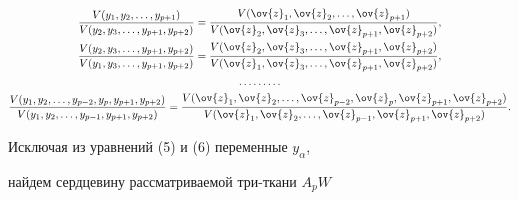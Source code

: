 \begin{gather}


\frac{V(y_{1}, y_{2}, \dotsc, y_{p+1})}{V(y_{2}, y_{3},


\dotsc, y_{p+1}, y_{p+2})}


=\frac{V(\ov{z}_{1}, \ov{z}_{2}, \dotsc, \ov{z}_{p+1})}


{V(\ov{z}_{2}, \ov{z}_{3}, \dotsc, \ov{z}_{p+1}, \ov{z}_{p+2})},\notag\\


%


\frac{V(y_{2}, y_{3}, \dotsc, y_{p+1}, y_{p+2})}{V(y_{1}, y_{3},


\dotsc, y_{p+1}, y_{p+2})}


=\frac{V(\ov{z}_{2}, \ov{z}_{3}, \dotsc, \ov{z}_{p+1}, \ov{z}_{p+2})}


{V(\ov{z}_{1}, \ov{z}_{3}, \dotsc, \ov{z}_{p+1}, \ov{z}_{p+2})},\notag\\


%


\dotsc \dotsc \dotsc \\ 


%


\frac{V(y_{1}, y_{2}, \dotsc, y_{p-2}, y_{p}, y_{p+1}, y_{p+2})}


{V(y_{1}, y_{2}, \dotsc, y_{p-1}, y_{p+1}, y_{p+2})}


=\frac{V(\ov{z}_{1}, \ov{z}_{2}, \dotsc, \ov{z}_{p-2},


\ov{z}_{p}, \ov{z}_{p+1}, \ov{z}_{p+2})}{V(\ov{z}_{1},


\ov{z}_{2}, \dotsc, \ov{z}_{p-1}, \ov{z}_{p+1}, \ov{z}_{p+2})}.\notag


\end{gather}





Исключая из уравнений (5) и (6) переменные $y_{\alpha}$,


найдем сердцевину рассматриваемой три-ткани $A_{p}W$



